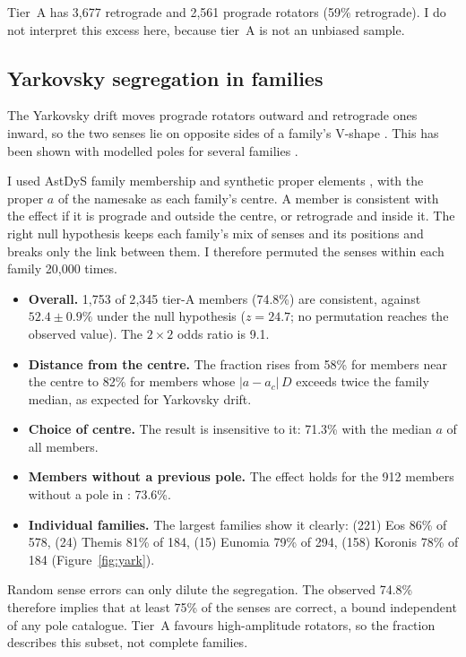 Tier~A has 3{,}677 retrograde and 2{,}561 prograde rotators (59\% retrograde). I do not interpret this
excess here, because tier~A is not an unbiased sample.

\subsection{Yarkovsky segregation in families}

The Yarkovsky drift moves prograde rotators outward and retrograde ones inward, so the two senses lie on
opposite sides of a family's V-shape \citep{Vokrouhlicky2015}. This has been shown with modelled poles
for several families \citep{Hanus2013,Hanus2018,Kryszczynska2013}.

I used AstDyS family membership and synthetic proper elements \citep{Knezevic2003,Milani2014}, with the
proper $a$ of the namesake as each family's centre. A member is consistent with the effect if it is
prograde and outside the centre, or retrograde and inside it. The right null hypothesis keeps each
family's mix of senses and its positions and breaks only the link between them. I therefore permuted the
senses within each family 20{,}000 times.

\begin{itemize}
\item \textbf{Overall.} 1{,}753 of 2{,}345 tier-A members (74.8\%) are consistent, against $52.4\pm0.9\%$
under the null hypothesis ($z=24.7$; no permutation reaches the observed value). The $2\times2$ odds ratio
is 9.1.
\item \textbf{Distance from the centre.} The fraction rises from 58\% for members near the centre to 82\% for
members whose $|a-a_c|\,D$ exceeds twice the family median, as expected for Yarkovsky drift.
\item \textbf{Choice of centre.} The result is insensitive to it: 71.3\% with the median $a$ of all members.
\item \textbf{Members without a previous pole.} The effect holds for the 912 members without a pole in
\citet{Durech2023}: 73.6\%.
\item \textbf{Individual families.} The largest families show it clearly: (221) Eos 86\% of 578, (24) Themis
81\% of 184, (15) Eunomia 79\% of 294, (158) Koronis 78\% of 184 (Figure~\ref{fig:yark}).
\end{itemize}

Random sense errors can only dilute the segregation. The observed 74.8\% therefore implies that at least
75\% of the senses are correct, a bound independent of any pole catalogue. Tier~A favours high-amplitude
rotators, so the fraction describes this subset, not complete families.

